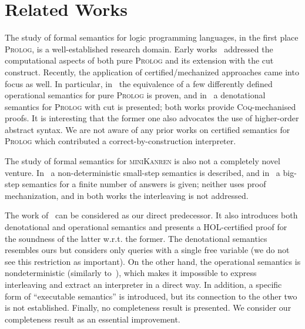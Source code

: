 \section{Related Works}

The study of formal semantics for logic programming languages, in the first place \textsc{Prolog}, is a well-established research domain. Early
works~\cite{JonesMycroftSemantics,DebrayMishraSemantics} addressed the computational aspects of both pure \textsc{Prolog} and its extension
with the cut construct. Recently, the application of certified/mechanized approaches came into focus as well. In particular,
in~\cite{CertifiedPrologEquivalences} the equivalence of a few differently defined operational semantics
for pure \textsc{Prolog} is proven, and in~\cite{CeritfiedDenotationalCut} a denotational semantics for \textsc{Prolog} with cut is presented; both
works provide \textsc{Coq}-mechanised proofs. It is interesting that the former one also advocates the use of higher-order
abstract syntax. We are not aware of any prior works on certified semantics for \textsc{Prolog} which contributed a correct-by-construction
interpreter.

The study of formal semantics for \textsc{miniKanren} is also not a completely novel venture. In~\cite{RelConversion} a non-deterministic
small-step semantics is described, and in~\cite{DivTest} a big-step semantics for a finite number of answers is given;
neither uses proof mechanization, and in both works the interleaving is not addressed. 

The work of~\citet{MechanisingMiniKanren} can be considered as our direct predecessor. It also introduces both denotational and
operational semantics and presents a HOL-certified proof for the soundness of the latter w.r.t. the former. The denotational
semantics resembles ours but considers only queries with a single free variable (we do not see this restriction as important).
On the other hand, the operational semantics is nondeterministic (similarly to~\cite{RelConversion}), which makes it
impossible to express interleaving and extract an interpreter in a direct way. In addition, a specific form of ``executable semantics''
is introduced, but its connection to the other two is not established. Finally, no completeness result is presented.
We consider our completeness result as an essential improvement. 




